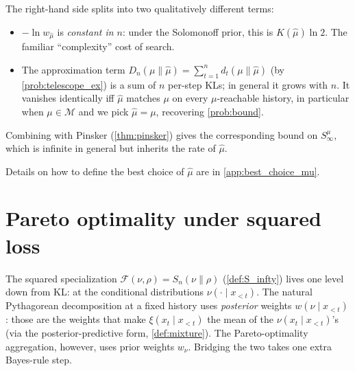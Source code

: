 \documentclass[fontsize=11pt, parskip=half]{scrartcl}
\newcommand{\Mc}{\mathcal{M}}
\newcommand{\Sn}[2]{S_{n}(#1 \parallel #2)}
\begin{document}
\begin{remark}
The right-hand side splits into two qualitatively different terms:
\begin{itemize}\itemsep=2pt
\item $-\ln w_{\hat\mu}$ is \emph{constant in $n$}: under the Solomonoff
prior, this is $K(\hat\mu)\ln 2$. The familiar ``complexity'' cost of search.
\item The approximation term $D_n(\mu \parallel \hat\mu) = \sum_{t=1}^n d_t(\mu \parallel \hat\mu)$ (by \cref{prob:telescope_ex}) is a sum of $n$ per-step KLs; in general it grows with $n$. It vanishes identically iff $\hat\mu$ matches $\mu$ on every $\mu$-reachable history, in particular when $\mu \in \Mc$ and we pick $\hat\mu = \mu$, recovering \cref{prob:bound}.
\end{itemize}
Combining with Pinsker (\cref{thm:pinsker}) gives the corresponding bound on
$S^\mu_\infty$, which is infinite in general but inherits the rate of $\hat\mu$.
\end{remark}

Details on how to define the best choice of $\hat{\mu}$ are in \cref{app:best_choice_mu}.

\section{Pareto optimality under squared loss}\label{prob:sq}

The squared specialization $\mathcal F(\nu, \rho) = \Sn{\nu}{\rho}$ (\cref{def:S_infty}) lives one level down from KL: at the conditional distributions
$\nu(\cdot \mid x_{<t})$. The natural Pythagorean decomposition at a fixed
history uses \emph{posterior} weights $w(\nu \mid x_{<t})$: those are the
weights that make $\xi(x_t \mid x_{<t})$ the mean of the $\nu(x_t \mid x_{<t})$'s
(via the posterior-predictive form, \cref{def:mixture}). The Pareto-optimality
aggregation, however, uses prior weights $w_\nu$. Bridging the two takes one
extra Bayes-rule step.
\end{document}
